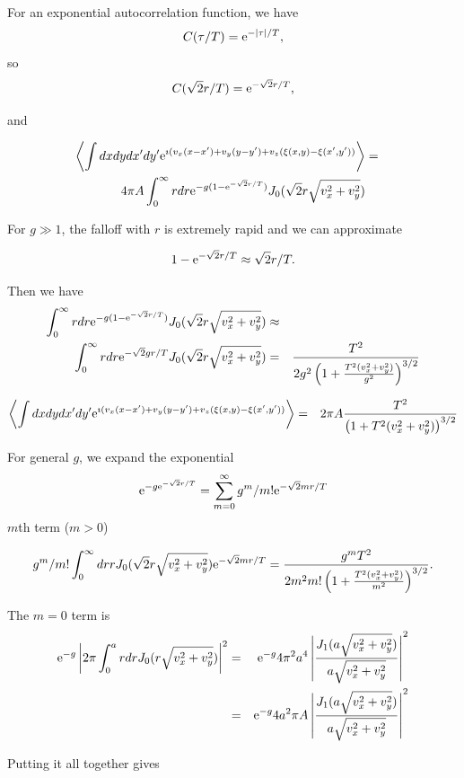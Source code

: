 \documentclass[11pt,openany]{report}
\newcommand{\e}{{\rm e}}
\begin{document}
{{For an exponential autocorrelation function, we have
 $$C(\tau/T)=\e^{-|\tau|/T},$$
 so
 $$C(\sqrt{2}r/T)=\e^{-\sqrt{2}r/T},$$

 and
 
 \begin{eqnarray}
\left<\int dx dydx'dy'\e^{\imath( v_{x}(x-x')+v_{y}(y-y')+v_{z}(\xi(x,y)-\xi(x',y'))}\right>&=&\\
4\pi A\int_{0}^{\infty} r dr\e^{-g(1-\e^{-\sqrt{2}r/T})} J_{0}(\sqrt{2}r\sqrt{v_{x}^{2}+v_{y}^{2}})\end{eqnarray}
 
For $g\gg 1$, the falloff with $r$ is extremely rapid and we can approximate

$$1-\e^{-\sqrt{2}r/T}\approx \sqrt{2}r/T.$$

 Then we have
\begin{eqnarray}
\int_{0}^{\infty} r dr\e^{-g(1-\e^{-\sqrt{2}r/T})} J_{0}(\sqrt{2}r\sqrt{v_{x}^{2}+v_{y}^{2}})&\approx&\\
\int_{0}^{\infty} r dr\e^{-\sqrt{2}gr/T} J_{0}(\sqrt{2}r\sqrt{v_{x}^{2}+v_{y}^{2}})&=&
\frac{T^{2}}{2g^{2}\left(1+\frac{T^{2}(v_{x}^{2}+v_{y}^{2})}{g^{2}}\right)^{3/2}}
\end{eqnarray}

 \begin{eqnarray}
\left<\int dx dydx'dy'\e^{\imath( v_{x}(x-x')+v_{y}(y-y')+v_{z}(\xi(x,y)-\xi(x',y'))}\right>&=&
2\pi A\frac{T^{2}}{\left(1+T^{2}(v_{x}^{2}+v_{y}^{2})\right)^{3/2}}
\end{eqnarray}

For general $g$, we expand the exponential
$$\e^{-g\e^{-\sqrt{2}r/T}}=\sum_{m=0}^{\infty}g^{m}/m!\e^{-\sqrt{2}mr/T}$$
$m$th term ($m > 0$)


$$g^{m}/m!\int_{0}^{\infty} dr rJ_{0}(\sqrt{2}r\sqrt{v_{x}^{2}+v_{y}^{2}})\e^{-\sqrt{2}mr/T}= \frac{g^{m}T^{2}}{2m^{2}m!\left(1+\frac{T^{2}(v_{x}^{2}+v_{y}^{2})}{m^{2}}\right)^{3/2}}.$$



The $m=0$  term is
\begin{eqnarray}
\e^{-g} \left|2\pi\int_{0}^{a}r dr J_{0}(r\sqrt{v_{x}^{2}+v_{y}^{2}})\right|^{2}&=&\e^{-g}4\pi^{2}a^{4}\left|\frac{J_{1}(a\sqrt{v_{x}^{2}+v_{y}^{2}})}{a\sqrt{v_{x}^{2}+v_{y}^{2}}}\right|^{2}\\
&=&\e^{-g}4a^{2}\pi A\left|\frac{J_{1}(a\sqrt{v_{x}^{2}+v_{y}^{2}})}{a\sqrt{v_{x}^{2}+v_{y}^{2}}}\right|^{2}\end{eqnarray}

Putting it all together gives

}}
\end{document}
